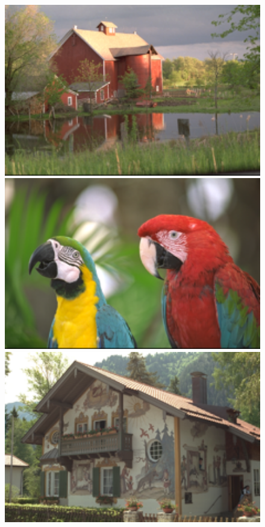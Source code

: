 \documentclass[10pt,twocolumn,letterpaper]{article}
\begin{document}
\begin{figure}
{\begin{minipage}{0.075\textwidth}
\end{minipage}
\begin{minipage}{0.075\textwidth}
\includegraphics[width=1\textwidth]{24images/resize_kodim22.png}
\end{minipage}
\begin{minipage}{0.075\textwidth}
\includegraphics[width=1\textwidth]{24images/resize_kodim23.png}
\end{minipage}
\begin{minipage}{0.075\textwidth}
\includegraphics[width=1\textwidth]{24images/resize_kodim24.png}

\end{minipage}}
\end{figure}
\end{document}
